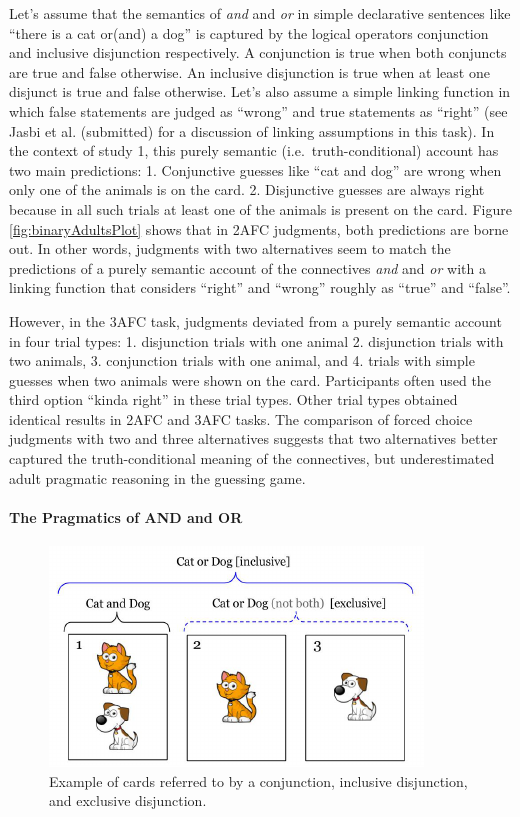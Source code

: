 \documentclass[floatsintext,man]{apa6}
\theoremstyle{definition}
\theoremstyle{definition}
\theoremstyle{definition}
\theoremstyle{remark}
\begin{document}
Let's assume that the semantics of \emph{and} and \emph{or} in simple
declarative sentences like \enquote{there is a cat or(and) a dog} is
captured by the logical operators conjunction and inclusive disjunction
respectively. A conjunction is true when both conjuncts are true and
false otherwise. An inclusive disjunction is true when at least one
disjunct is true and false otherwise. Let's also assume a simple linking
function in which false statements are judged as \enquote{wrong} and
true statements as \enquote{right} (see Jasbi et al. (submitted) for a
discussion of linking assumptions in this task). In the context of study
1, this purely semantic (i.e.~truth-conditional) account has two main
predictions: 1. Conjunctive guesses like \enquote{cat and dog} are wrong
when only one of the animals is on the card. 2. Disjunctive guesses are
always right because in all such trials at least one of the animals is
present on the card. Figure \ref{fig:binaryAdultsPlot} shows that in
2AFC judgments, both predictions are borne out. In other words,
judgments with two alternatives seem to match the predictions of a
purely semantic account of the connectives \emph{and} and \emph{or} with
a linking function that considers \enquote{right} and \enquote{wrong}
roughly as \enquote{true} and \enquote{false}.

However, in the 3AFC task, judgments deviated from a purely semantic
account in four trial types: 1. disjunction trials with one animal 2.
disjunction trials with two animals, 3. conjunction trials with one
animal, and 4. trials with simple guesses when two animals were shown on
the card. Participants often used the third option \enquote{kinda right}
in these trial types. Other trial types obtained identical results in
2AFC and 3AFC tasks. The comparison of forced choice judgments with two
and three alternatives suggests that two alternatives better captured
the truth-conditional meaning of the connectives, but underestimated
adult pragmatic reasoning in the guessing game.

\paragraph{The Pragmatics of AND and OR}\label{implicature}

\begin{figure}
\centering
\includegraphics{figs/exclusivity-1.pdf}
\caption{\label{fig:exclusivity}Example of cards referred to by a
conjunction, inclusive disjunction, and exclusive disjunction.}
\end{figure}
\end{document}

